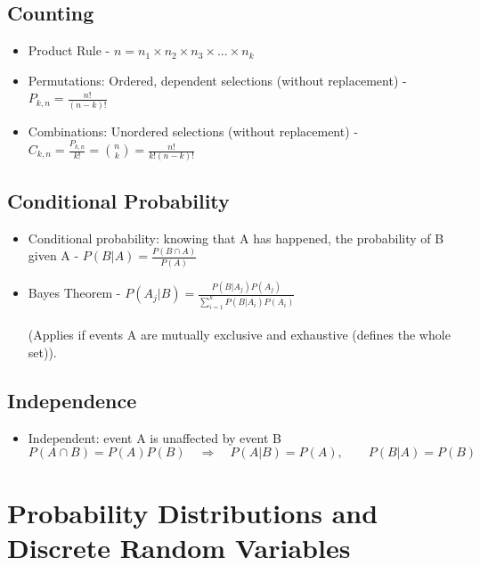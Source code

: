 \documentclass{article}
\begin{document}
\subsection*{Counting}
\begin{itemize}
\item Product Rule - $\displaystyle n = n_{1}\times n_{2}\times n_{3}\times...\times n_{k}$
    \item Permutations: Ordered, dependent selections (without replacement) -
    $\displaystyle P_{k,n} = \frac{n!}{(n-k)!}$
    \item Combinations: Unordered selections (without replacement) - 
    $\displaystyle C_{k,n} = \frac{P_{k,n}}{k!} = {n \choose k} = \frac{n!}{k!(n-k)!}$
\end{itemize}

\subsection*{Conditional Probability}
\begin{itemize}
    \item Conditional probability: knowing that A has happened, the probability of B given A - $\displaystyle P(B|A) = \frac{P(B \cap A)}{P(A)}$
    \item Bayes Theorem - $\displaystyle P(A_{j}|B) = \frac{P(B|A_{j})P(A_{j})}{\sum_{i=1}^{k}P(B|A_{i})P(A_{i})} $\\\\
    (Applies if events A are mutually exclusive and exhaustive (defines the whole set)).
\end{itemize}

\subsection*{Independence}
\begin{itemize}
    \item Independent: event A is unaffected by event B
    \[P(A\cap B)=P(A)P(B) \quad \Rightarrow \quad P(A|B) = P(A), \quad\quad P(B|A) = P(B)\]
\end{itemize}



\section{Probability Distributions and Discrete Random Variables}
\end{document}
